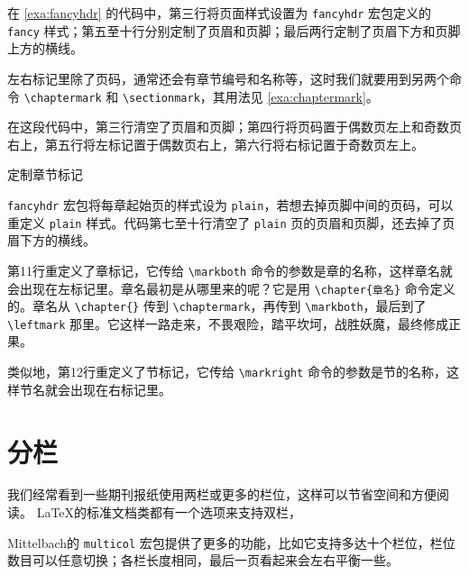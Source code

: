 在 \autoref{exa:fancyhdr} 的代码中，第三行将页面样式设置为 \texttt{fancyhdr} 宏包定义的 \texttt{fancy} 样式；第五至十行分别定制了页眉和页脚；最后两行定制了页眉下方和页脚上方的横线。

左右标记里除了页码，通常还会有章节编号和名称等，这时我们就要用到另两个命令 \verb|\chaptermark| 和 \verb|\sectionmark|，其用法见 \autoref{exa:chaptermark}。

在这段代码中，第三行清空了页眉和页脚；第四行将页码置于偶数页左上和奇数页右上，第五行将左标记置于偶数页右上，第六行将右标记置于奇数页左上。

\begin{example}[htbp]
\caption{定制章节标记}
\label{exa:chaptermark}
\end{example}

\texttt{fancyhdr} 宏包将每章起始页的样式设为 \texttt{plain}，若想去掉页脚中间的页码，可以重定义 \texttt{plain} 样式。代码第七至十行清空了 \texttt{plain} 页的页眉和页脚，还去掉了页眉下方的横线。

第11行重定义了章标记，它传给 \verb|\markboth| 命令的参数是章的名称，这样章名就会出现在左标记里。章名最初是从哪里来的呢？它是用 \verb|\chapter{章名}| 命令定义的。章名从 \verb|\chapter{}| 传到 \verb|\chaptermark|，再传到 \verb|\markboth|，最后到了 \verb|\leftmark| 那里。它这样一路走来，不畏艰险，踏平坎坷，战胜妖魔，最终修成正果。

类似地，第12行重定义了节标记，它传给 \verb|\markright| 命令的参数是节的名称，这样节名就会出现在右标记里。

\section{分栏}

我们经常看到一些期刊报纸使用两栏或更多的栏位，这样可以节省空间和方便阅读。 \LaTeX 的标准文档类都有一个选项来支持双栏，


Mittelbach\indexMittelbach 的 \texttt{multicol} 宏包提供了更多的功能，比如它支持多达十个栏位，栏位数目可以任意切换；各栏长度相同，最后一页看起来会左右平衡一些。


